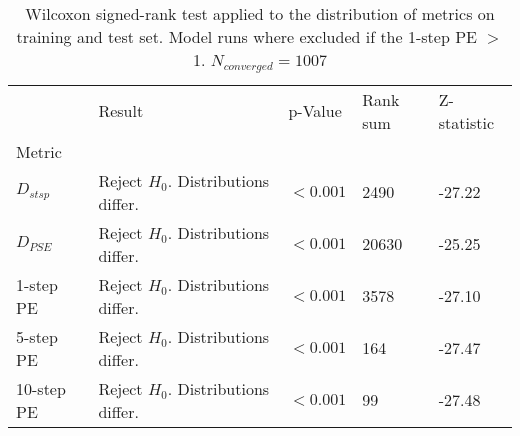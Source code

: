 \begin{table}
\centering
\caption{Wilcoxon signed-rank test applied to the distribution of metrics on training and test set. Model runs where excluded if the 1-step PE $>$ 1. $N_{converged}=1007$}
\label{tab:wilcoxon_test_metrics_train_test}
\begin{tabular}{lllll}
\toprule
 & Result & p-Value & Rank sum & Z-statistic \\
Metric &  &  &  &  \\
\midrule
$D_{stsp}$ & Reject $H_0$. Distributions differ. & $<0.001$ & 2490 & -27.22 \\
$D_{PSE}$ & Reject $H_0$. Distributions differ. & $<0.001$ & 20630 & -25.25 \\
1-step PE & Reject $H_0$. Distributions differ. & $<0.001$ & 3578 & -27.10 \\
5-step PE & Reject $H_0$. Distributions differ. & $<0.001$ & 164 & -27.47 \\
10-step PE & Reject $H_0$. Distributions differ. & $<0.001$ & 99 & -27.48 \\
\bottomrule
\end{tabular}
\end{table}
